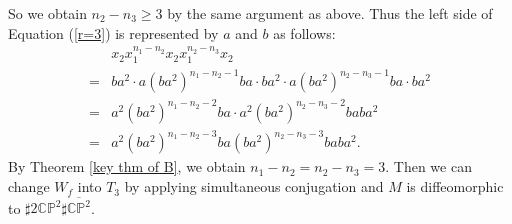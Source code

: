 \documentclass{amsart}
\theoremstyle{plain}
\theoremstyle{definition}
\begin{document}
So we obtain $n_2-n_3\geq 3$ by the same argument as above. 
Thus the left side of Equation (\ref{r=3}) is represented by $a$ and $b$ as follows: 
{\allowdisplaybreaks
\begin{align*}
& x_2x_1^{n_1-n_2}x_2x_1^{n_2-n_3}x_2 \\
= & ba^2\cdot a(ba^2)^{n_1-n_2-1}ba\cdot ba^2\cdot a(ba^2)^{n_2-n_3-1}ba\cdot ba^2 \\
= & a^2(ba^2)^{n_1-n_2-2}ba\cdot a^2(ba^2)^{n_2-n_3-2}baba^2 \\
= & a^2(ba^2)^{n_1-n_2-3}ba(ba^2)^{n_2-n_3-3}baba^2. 
\end{align*}
}
By Theorem \ref{key thm of B}, we obtain $n_1-n_2=n_2-n_3=3$. 
Then we can change $W_f$ into $T_3$ by applying simultaneous conjugation and $M$ is diffeomorphic to $\sharp 2\mathbb{CP}^2\sharp\overline{\mathbb{CP}^2}$. 

\par
\end{document}
